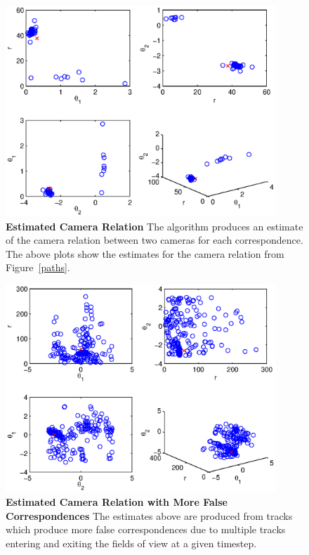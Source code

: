 \documentclass[journal]{IEEEtran}
\begin{document}
	\begin{figure}
		\centering
		\includegraphics[width=4in]{./point_cloud.eps}
		\caption{\textbf{Estimated Camera Relation} The algorithm produces an estimate 
											of the camera relation between two
											cameras for each correspondence. 
											The above plots show the estimates
											for the camera relation from
											Figure~\ref{paths}.}
		\label{point_cloud}
	\end{figure}

	
	\begin{figure}[H]
		\centering
		\includegraphics[width=4in]{./noisy_point_cloud.eps}
		\caption{\textbf{Estimated Camera Relation with More False Correspondences} 
					The estimates above are produced from tracks which produce
					more false correspondences due to multiple tracks entering and
					exiting the fields of view at a given timestep.}
		\label{noisy_point_cloud}
	\end{figure}
\end{document}
